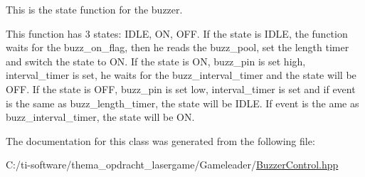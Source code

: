 This is the state function for the buzzer. 

This function has 3 states\+: I\+D\+LE, ON, O\+FF. If the state is I\+D\+LE, the function waits for the buzz\+\_\+on\+\_\+flag, then he reads the buzz\+\_\+pool, set the length timer and switch the state to ON. If the state is ON, buzz\+\_\+pin is set high, interval\+\_\+timer is set, he waits for the buzz\+\_\+interval\+\_\+timer and the state will be O\+FF. If the state is O\+FF, buzz\+\_\+pin is set low, interval\+\_\+timer is set and if event is the same as buzz\+\_\+length\+\_\+timer, the state will be I\+D\+LE. If event is the ame as buzz\+\_\+interval\+\_\+timer, the state will be ON. 

The documentation for this class was generated from the following file\+:\begin{DoxyCompactItemize}
\item 
C\+:/ti-\/software/thema\+\_\+opdracht\+\_\+lasergame/\+Gameleader/\mbox{\hyperlink{_gameleader_2_buzzer_control_8hpp}{Buzzer\+Control.\+hpp}}\end{DoxyCompactItemize}

